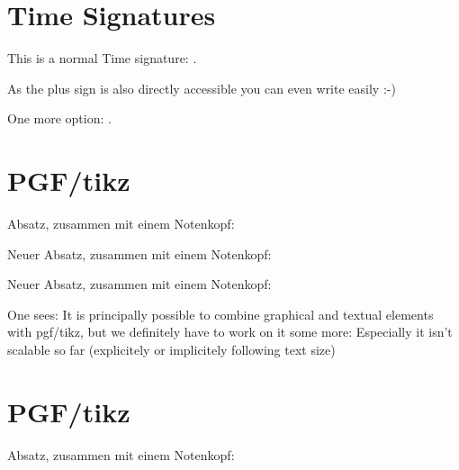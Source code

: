 \documentclass{scrartcl}
\begin{document}
\section*{Time Signatures}
	This is a normal Time signature: .
	
	As the plus sign is also directly accessible you can even
	write  easily :-)
	
	One more option: \lilyText{+}. 
	
\section*{PGF/tikz}

Absatz, zusammen mit einem Notenkopf: 

\Large
Neuer Absatz, zusammen mit einem Notenkopf: 

\normalsize
Neuer Absatz, zusammen mit einem Notenkopf: 

One sees: It is principally possible to combine graphical and textual elements with pgf/tikz,
but we definitely have to work on it some more: Especially it isn't scalable so far (explicitely or implicitely following text size)

	
\section*{PGF/tikz}

Absatz, zusammen mit einem Notenkopf: 
\end{document}
